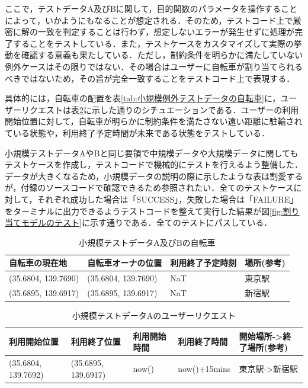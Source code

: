           \par ここで，テストデータA及びBに関して，目的関数のパラメータを操作することによって，いかようにもなることが想定される．そのため，テストコード上で厳密に解の一致を判定することは行わず，想定しないエラーが発生せずに処理が完了することをテストしている．また，テストケースをカスタマイズして実際の挙動を確認する意義も果たしている．ただし，制約条件を明らかに満たしていない例外ケースはその限りではない．その場合はユーザーに自転車が割り当てられるべきではないため，その旨が完全一致することをテストコード上で表現する．
          \par 具体的には，自転車の配置を表\ref{tab:小規模例外テストデータの自転車}に，ユーザーリクエストは表\ref{tab:小規模テストデータAのユーザーリクエスト}に示した通りのシチュエーションである．ユーザーの利用開始位置に対して，自転車が明らかに制約条件を満たさない遠い距離に駐輪されている状態や，利用終了予定時間が未来である状態をテストしている．
          \par 小規模テストデータAやBと同じ要領で中規模データや大規模データに関してもテストケースを作成し，テストコードで機械的にテストを行えるよう整備した．データが大きくなるため，小規模データの説明の際に示したような表は割愛するが，付録のソースコードで確認できるため参照されたい．全てのテストケースに対して，それぞれ成功した場合は「SUCCESS」，失敗した場合は「FAILURE」をターミナルに出力できるようテストコードを整えて実行した結果が図\ref{fig:割り当てモデルのテスト}に示す通りである．全てのテストにパスしている．

          \begin{table}[t]
            \caption{小規模テストデータA及びBの自転車}
            \label{tab:小規模テストデータA及びBの自転車}
            \centering
            \begin{tabular}{|l|l|l|l|} \hline
              自転車の現在地 & 自転車オーナの位置 & 利用終了予定時刻 & 場所(参考) \\ \hline
              (35.6804, 139.7690) & (35.6804, 139.7690) & NaT & 東京駅 \\
              (35.6895, 139.6917) & (35.6895, 139.6917) & NaT & 新宿駅 \\ \hline
            \end{tabular}
          \end{table}
          
          \begin{table}[t]
            \caption{小規模テストデータAのユーザーリクエスト}
            \label{tab:小規模テストデータAのユーザーリクエスト}
            \centering
            \begin{tabular}{|l|l|l|l|l|} \hline
              利用開始位置 & 利用終了位置 & 利用開始時間 & 利用終了時間 & 開始場所->終了場所(参考) \\ \hline
              (35.6804, 139.7692) & (35.6895, 139.6917) & now() & now()+15mins & 東京駅->新宿駅 \\ \hline
            \end{tabular}
          \end{table}

